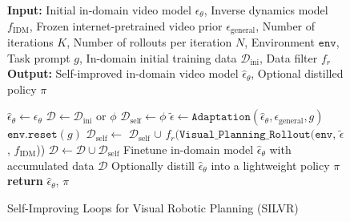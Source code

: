 \begin{figure}[t]
\begin{minipage}{\linewidth}
\begin{algorithm}[H]
    \caption{Self-Improving Loops for Visual Robotic Planning (SILVR)}
    \label{algo:sail_pseudocode}
    \hspace*{\algorithmicindent} \textbf{Input:} Initial in-domain video model $\epsilon_{\theta}$, Inverse dynamics model $f_{\text{IDM}}$, Frozen internet-pretrained video prior $\epsilon_{\text{general}}$, Number of iterations $K$, Number of rollouts per iteration $N$, Environment $\texttt{env}$, Task prompt $g$, In-domain initial training data $\mathcal{D}_{\text{ini}}$, Data filter $f_{r}$ \\
    \hspace*{\algorithmicindent} \textbf{Output:} Self-improved in-domain video model $\hat{\epsilon}_{\theta}$, Optional distilled policy $\pi$
    \begin{algorithmic}[1]
        \State $\hat{\epsilon}_{\theta} \gets \epsilon_{\theta}$
        \State $\mathcal{D} \gets \mathcal{D}_{\text{ini}}$ or $\phi$
        \State $\mathcal{D}_{\text{self}} \gets \phi$
        \State $\tilde{\epsilon} \gets \texttt{Adaptation}(\hat{\epsilon}_{\theta}, \epsilon_{\text{general}}, g)$
                \State $\texttt{env.reset}(g)$
                \State $\mathcal{D}_{\text{self}} \gets$ $\mathcal{D}_{\text{self}}$ $\cup$ $f_{r}(\texttt{Visual\_Planning\_Rollout}(\texttt{env}$, $\tilde{\epsilon}$, $f_{\text{IDM}}$)) %
            \EndFor
        \State $\mathcal{D} \gets \mathcal{D} \cup \mathcal{D}_{\text{self}}$ 
        \State Finetune in-domain model $\hat{\epsilon}_{\theta}$ with accumulated data $\mathcal{D}$
        \EndFor
        \State Optionally distill $\hat{\epsilon}_{\theta}$ into a lightweight policy $\pi$
        \State \textbf{return} $\hat{\epsilon}_{\theta}$, $\pi$
    \end{algorithmic}
\end{algorithm}
\end{minipage}
\end{figure}


